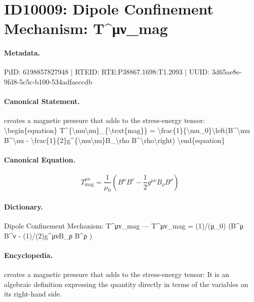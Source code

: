 \section*{ID10009: Dipole Confinement Mechanism: T\textasciicircum{}μν\_mag}
\paragraph{Metadata.}
PiID: 6198857827948 | RTEID: RTE:P38867.1698:T1.2093 | UUID: 3d65ae8e-9fd8-5c5c-b100-534adfaeccdb

\paragraph{Canonical Statement.}
creates a magnetic pressure that adds to the stress-energy tensor: \textbackslash{}begin\{equation\} T\textasciicircum{}\{\textbackslash{}mu\textbackslash{}nu\}\_\{\textbackslash{}text\{mag\}\} = \textbackslash{}frac\{1\}\{\textbackslash{}mu\_0\}\textbackslash{}left(B\textasciicircum{}\textbackslash{}mu B\textasciicircum{}\textbackslash{}nu - \textbackslash{}frac\{1\}\{2\}g\textasciicircum{}\{\textbackslash{}mu\textbackslash{}nu\}B\_\textbackslash{}rho B\textasciicircum{}\textbackslash{}rho\textbackslash{}right) \textbackslash{}end\{equation\}

\paragraph{Canonical Equation.}
\[
T^{\mu\nu}_{\text{mag}} = \frac{1}{\mu_0}\left(B^\mu B^\nu - \frac{1}{2}g^{\mu\nu}B_\rho B^\rho\right)
\]

\paragraph{Dictionary.}
Dipole Confinement Mechanism: T\textasciicircum{}μν\_mag — T\textasciicircum{}μν\_mag = (1)/(μ\_0) (B\textasciicircum{}μ B\textasciicircum{}ν - (1)/(2)g\textasciicircum{}μνB\_ρ B\textasciicircum{}ρ )

\paragraph{Encyclopedia.}
creates a magnetic pressure that adds to the stress-energy tensor: It is an algebraic definition expressing the quantity directly in terms of the variables on its right-hand side.
